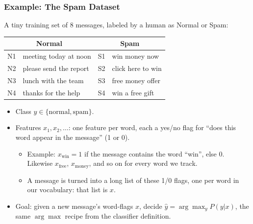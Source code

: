 \begin{frame}[fragile]\frametitle{Example: The Spam Dataset}
A tiny training set of 8 messages, labeled by a human as Normal or Spam:
\begin{center}
\small
\begin{tabular}{cl|cl}
\multicolumn{2}{c|}{\textbf{Normal}} & \multicolumn{2}{c}{\textbf{Spam}} \\ \hline
N1 & meeting today at noon    & S1 & win money now \\
N2 & please send the report   & S2 & click here to win \\
N3 & lunch with the team      & S3 & free money offer \\
N4 & thanks for the help      & S4 & win a free gift
\end{tabular}
\end{center}
\begin{itemize}
\item Class $y \in \{\text{normal}, \text{spam}\}$.
\item Features $x_1, x_2, \ldots$: one feature per word, each a yes/no flag for ``does this word appear in the message'' (1 or 0).
  \begin{itemize}
  \item Example: $x_{\text{win}}=1$ if the message contains the word ``win'', else $0$. Likewise $x_{\text{free}}$, $x_{\text{money}}$, and so on for every word we track.
  \item A message is turned into a long list of these 1/0 flags, one per word in our vocabulary: that list is $x$.
  \end{itemize}
\item Goal: given a new message's word-flags $x$, decide $\hat{y} = \arg\max_y P(y|x)$, the same $\arg\max$ recipe from the classifier definition.
\end{itemize}
\end{frame}

